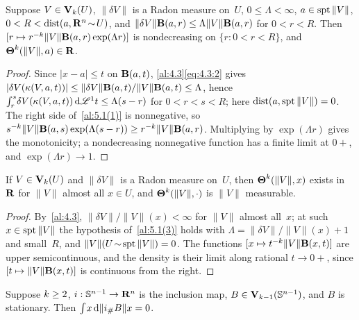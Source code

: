 \begin{corollary}
    \label{al:5.1(3)}
    Suppose $V \in \mathbf{V}_{k}(U)$, $\|\delta V\|$ is a Radon measure on~$U$, $0 \le \Lambda <
    \infty$, $a \in \operatorname{spt} \|V\|$, $0 < R < \operatorname{dist}(a, \mathbf{R}^{n} \!\sim\! U)$, and $\|\delta V\|
    \mathbf{B}(a,r) \le \Lambda \|V\| \mathbf{B}(a,r)$ for $0 < r < R$. Then $[r \mapsto r^{-k}
    \|V\| \mathbf{B}(a,r) \exp(\Lambda r)]$ is nondecreasing on $\{ r : 0 < r < R \}$, and
    $\boldsymbol{\Theta}^{k}(\|V\|,a) \in \mathbf{R}$.
\end{corollary}

\begin{proof}
    Since $|x - a| \le t$ on $\mathbf{B}(a,t)$, \ref{al:4.3}\eqref{eq:4.3:2} gives $|\delta
    V(\kappa(V,a,t))| \le \|\delta V\| \mathbf{B}(a,t) / \|V\| \mathbf{B}(a,t) \le \Lambda$, hence
    ${\textstyle\int_{r}^{s}} \delta V(\kappa(V,a,t)) \,\mathrm{d} \mathscr{L}^1 t \le \Lambda (s - r)$ for $0 < r < s < R$;
    here $\operatorname{dist}(a, \operatorname{spt} \|V\|) = 0$. The right side of~\ref{al:5.1(1)} is nonnegative, so
    $s^{-k} \|V\| \mathbf{B}(a,s) \exp(\Lambda(s-r)) \ge r^{-k} \|V\| \mathbf{B}(a,r)$.
    Multiplying by $\exp(\Lambda r)$ gives the monotonicity; a nondecreasing nonnegative function
    has a finite limit at $0+$, and $\exp(\Lambda r) \to 1$.
\end{proof}

\begin{corollary}
    \label{al:5.1(4)}
    If $V \in \mathbf{V}_{k}(U)$ and $\|\delta V\|$ is a Radon measure on~$U$, then
    $\boldsymbol{\Theta}^{k}(\|V\|,x)$ exists in~$\mathbf{R}$ for $\|V\|$ almost all $x \in U$, and
    $\boldsymbol{\Theta}^{k}(\|V\|,\cdot)$ is $\|V\|$ measurable.
\end{corollary}

\begin{proof}
    By~\ref{al:4.3}, $\|\delta V\| / \|V\|(x) < \infty$ for $\|V\|$ almost all~$x$; at such $x
    \in \operatorname{spt} \|V\|$ the hypothesis of~\ref{al:5.1(3)} holds with $\Lambda = \|\delta V\| /
    \|V\|(x) + 1$ and small~$R$, and $\|V\|(U \!\sim\! \operatorname{spt} \|V\|) = 0$. The functions $[x \mapsto
    t^{-k} \|V\| \mathbf{B}(x,t)]$ are upper semicontinuous, and the density is their limit along
    rational $t \to 0+$, since $[t \mapsto \|V\| \mathbf{B}(x,t)]$ is continuous from the right.
\end{proof}

\begin{lemma}
    \label{al:5.2(1)}
    Suppose $k \ge 2$, $i : \mathbb{S}^{n-1} \to \mathbf{R}^{n}$ is the inclusion map, $B \in
    \mathbf{V}_{k-1}(\mathbb{S}^{n-1})$, and $B$ is stationary. Then ${\textstyle\int_{}^{}} x \,\mathrm{d} \|i_\# B\| x
    = 0$.
\end{lemma}

